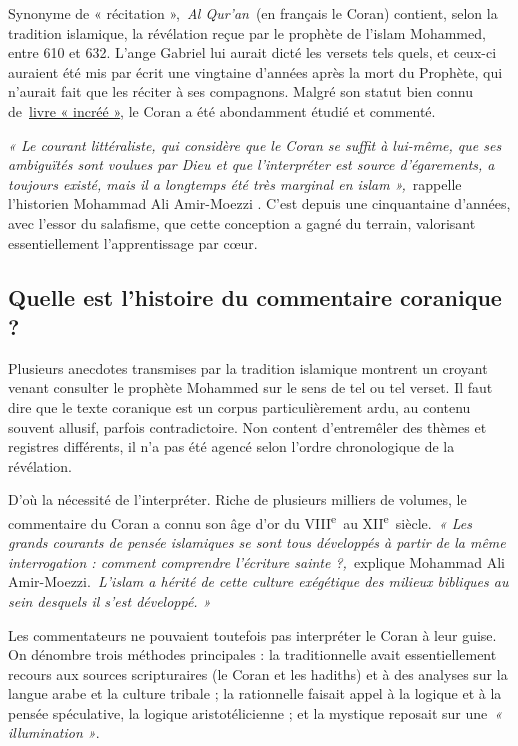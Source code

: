 Synonyme de « récitation »,~\emph{Al Qur'an}~(en français le Coran)
contient, selon la tradition islamique, la révélation reçue par le
prophète de l'islam Mohammed, entre 610 et 632. L'ange Gabriel lui
aurait dicté les versets tels quels, et ceux-ci auraient été mis par
écrit une vingtaine d'années après la mort du Prophète, qui n'aurait
fait que les réciter à ses compagnons. Malgré son statut bien connu
de~\href{https://www.la-croix.com/Religion/Islam/Comprendre-Coran-2016-06-10-1200767802}{\underline{livre
« incréé »}}, le Coran a été abondamment étudié et commenté.

\emph{« Le courant littéraliste, qui considère que le Coran se suffit à
lui-même, que ses ambiguïtés sont voulues par Dieu et que l'interpréter
est source d'égarements, a toujours existé, mais il a longtemps été très
marginal en islam »,}~rappelle l'historien Mohammad
Ali Amir-Moezzi 
 . C'est depuis une cinquantaine d'années, avec
l'essor du salafisme, que cette conception a gagné du terrain,
valorisant essentiellement l'apprentissage par cœur.
 
 

\subsection{ Quelle est l'histoire du commentaire coranique ?}

Plusieurs anecdotes transmises par la tradition islamique montrent un
croyant venant consulter le prophète Mohammed sur le sens de tel ou tel
verset. Il faut dire que le texte coranique est un corpus
particulièrement ardu, au contenu souvent allusif, parfois
contradictoire. Non content d'entremêler des thèmes et registres
différents, il n'a pas été agencé selon l'ordre chronologique de la
révélation.

 
D'où la nécessité de l'interpréter. Riche de plusieurs milliers de
volumes, le commentaire du Coran a connu son âge d'or du
VIII\textsuperscript{e}~au XII\textsuperscript{e}~siècle.\emph{~« Les
grands courants de pensée islamiques se sont tous développés à partir de
la même interrogation : comment comprendre l'écriture sainte
?,~}explique Mohammad Ali Amir-Moezzi.\emph{~­L'islam a hérité de cette
culture exégétique des milieux bibliques au sein desquels il s'est
développé. »}

Les commentateurs ne pouvaient toutefois pas interpréter le Coran à leur
guise. On dénombre trois méthodes principales : la traditionnelle avait
essentiellement recours aux sources scripturaires (le Coran et les
hadiths) et à des analyses sur la langue arabe et la culture tribale ;
la rationnelle faisait appel à la logique et à la pensée spéculative, la
logique aristotélicienne ; et la mystique reposait sur une~\emph{«
illumination »}.

